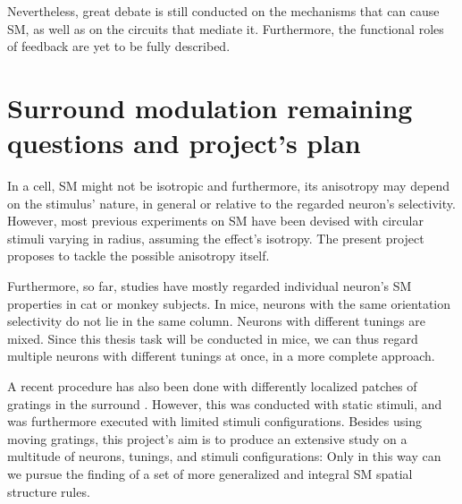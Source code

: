 Nevertheless, great debate is still conducted on the mechanisms that can cause SM, as well as on the circuits that mediate it. Furthermore, the functional roles of feedback are yet to be fully described.

\section{Surround modulation remaining questions and project's plan} \label{Plan}

In a cell, SM might not be isotropic and furthermore, its anisotropy may depend on the stimulus' nature, in general or relative to the regarded neuron's selectivity. However, most previous experiments on SM have been devised with circular stimuli varying in radius, assuming the effect's isotropy. The present project proposes to tackle the possible anisotropy itself.

Furthermore, so far, studies have mostly regarded individual neuron's SM properties in cat or monkey subjects. In mice, neurons with the same orientation selectivity do not lie in the same column. Neurons with different tunings are mixed. Since this thesis task will be conducted in mice, we can thus regard multiple neurons with different tunings at once, in a more complete approach.

A recent procedure has also been done with differently localized patches of gratings in the surround \cite{SManisotropy}. However, this was conducted with static stimuli, and was furthermore executed with limited stimuli configurations. Besides using moving gratings, this project's aim is to produce an extensive study on a multitude of neurons, tunings, and stimuli configurations: Only in this way can we pursue the finding of a set of more generalized and integral SM spatial structure rules.

